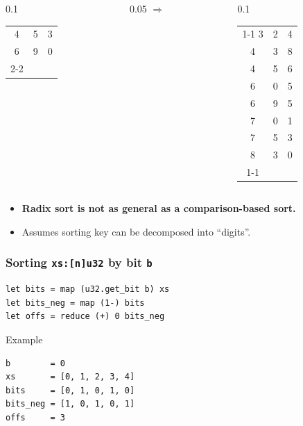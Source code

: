 \begin{frame}
\begin{columns}
\begin{column}{0.1\textwidth}
\begin{tabular}{c|c|c}
        4 & 5 & 3 \\
        6 & 9 & 0 \\
        \cline{2-2}
      \end{tabular}
    \end{column}
    \begin{column}{0.05\textwidth}
      $\Rightarrow$
    \end{column}
    \begin{column}{0.1\textwidth}
      \begin{tabular}{|c|cc}
        \cline{1-1}
        3 & 2 & 4 \\
        4 & 3 & 8 \\
        4 & 5 & 6 \\
        6 & 0 & 5 \\
        6 & 9 & 5 \\
        7 & 0 & 1 \\
        7 & 5 & 3 \\
        8 & 3 & 0 \\
        \cline{1-1}
      \end{tabular}
    \end{column}
  \end{columns}

  \addtolength{\tabcolsep}{5pt}

  \pause

  \bigskip\bigskip
  \begin{itemize}
  \item \textbf{Radix sort is not as general as a comparison-based sort.}
  \item Assumes sorting key can be decomposed into ``digits''.
  \end{itemize}

\end{frame}

\begin{frame}
  \frametitle{Sorting \texttt{xs:[n]u32} by bit \texttt{b}}

\begin{lstlisting}
let bits = map (u32.get_bit b) xs
let bits_neg = map (1-) bits
let offs = reduce (+) 0 bits_neg
\end{lstlisting}

\pause

\begin{block}{Example}
\begin{lstlisting}
b        = 0
xs       = [0, 1, 2, 3, 4]
bits     = [0, 1, 0, 1, 0]
bits_neg = [1, 0, 1, 0, 1]
offs     = 3
\end{lstlisting}
\end{block}

\end{frame}

